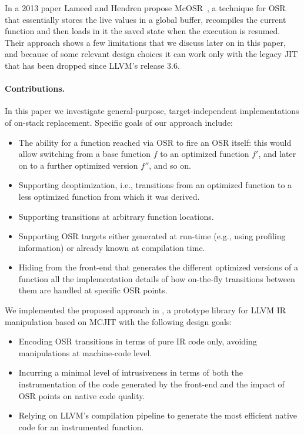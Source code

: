 In a 2013 paper Lameed and Hendren propose McOSR~\cite{lameed2013modular}, a technique for OSR that essentially stores the live values in a global buffer, recompiles the current function and then loads in it the saved state when the execution is resumed. Their approach shows a few limitations that we discuss later on in this paper, and because of some relevant design choices it can work only with the legacy JIT that has been dropped since LLVM's release 3.6.

\paragraph{Contributions.}
In this paper we investigate general-purpose, target-independent implementations of on-stack replacement. Specific goals of our approach include:
\begin{itemize}
\item The ability for a function reached via OSR to fire an OSR itself: this would allow switching from a base function $f$ to an optimized function $f'$, and later on to a further optimized version $f''$, and so on.
\item Supporting deoptimization, i.e., transitions from an optimized function to a less optimized function from which it was derived.
\item Supporting transitions at arbitrary function locations.
\item Supporting OSR targets either generated at run-time (e.g., using profiling information) or already known at compilation time.
\item Hiding from the front-end that generates the different optimized versions of a function all the implementation details of how on-the-fly transitions between them are handled at specific OSR points.
\end{itemize}

\noindent We implemented the proposed approach in \osrkit, a prototype library for LLVM IR manipulation based on MCJIT with the following design goals:
\begin{itemize}
\item Encoding OSR transitions in terms of pure IR code only, avoiding manipulations at machine-code level.
\item Incurring a minimal level of intrusiveness in terms of both the instrumentation of the code generated by the front-end and the impact of OSR points on native code quality.
\item Relying on LLVM's compilation pipeline to generate the most efficient native code for an instrumented function.
\end{itemize}

